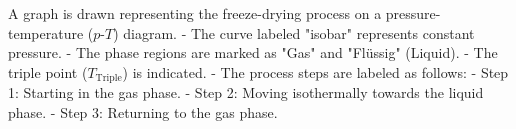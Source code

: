 A graph is drawn representing the freeze-drying process on a pressure-temperature (\(p\)-\(T\)) diagram.  
- The curve labeled "isobar" represents constant pressure.  
- The phase regions are marked as "Gas" and "Flüssig" (Liquid).  
- The triple point (\(T_{\text{Triple}}\)) is indicated.  
- The process steps are labeled as follows:  
  - Step 1: Starting in the gas phase.  
  - Step 2: Moving isothermally towards the liquid phase.  
  - Step 3: Returning to the gas phase.